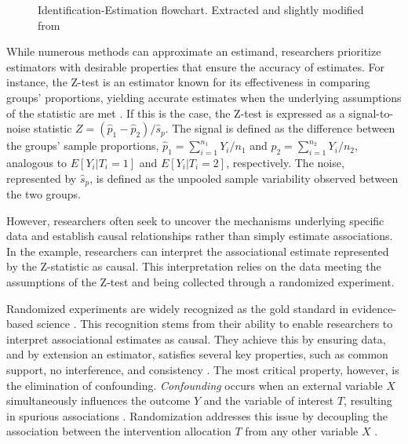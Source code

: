 \documentclass[
  authoryear,
  review,
  1p]{elsarticle}
\begin{document}
\begin{figure}


\caption{\label{fig-IEflow}Identification-Estimation flowchart.
Extracted and slightly modified from \citet[pp.~32]{Neal_2020}}

\end{figure}%

While numerous methods can approximate an estimand, researchers
prioritize estimators with desirable properties that ensure the accuracy
of estimates. For instance, the Z-test is an estimator known for its
effectiveness in comparing groups' proportions, yielding accurate
estimates when the underlying assumptions of the statistic are met
\citep{Kanji_2006}. If this is the case, the Z-test is expressed as a
signal-to-noise statistic
\(Z = (\hat{p}_{1} - \hat{p}_{2})/ \hat{s}_{p}\). The signal is defined
as the difference between the groups' sample proportions,
\(\hat{p}_{1} = \sum_{i=1}^{n_{1}}{Y_{i}/n_{1}}\) and
\(\hat{p}_{2} = \sum_{i=1}^{n_{2}}{Y_{i}/n_{2}}\), analogous to
\(E[Y_{i}| T_{i}=1]\) and \(E[Y_{i}| T_{i}=2]\), respectively. The
noise, represented by \(\hat{s}_{p}\), is defined as the unpooled sample
variability observed between the two groups.

However, researchers often seek to uncover the mechanisms underlying
specific data and establish causal relationships rather than simply
estimate associations. In the example, researchers can interpret the
associational estimate represented by the Z-statistic as causal. This
interpretation relies on the data meeting the assumptions of the Z-test
and being collected through a randomized experiment.

Randomized experiments are widely recognized as the gold standard in
evidence-based science \citep{Hariton_et_al_2018, Hansson_2014}. This
recognition stems from their ability to enable researchers to interpret
associational estimates as causal. They achieve this by ensuring data,
and by extension an estimator, satisfies several key properties, such as
common support, no interference, and consistency
\citep{Morgan_et_al_2014, Neal_2020}. The most critical property,
however, is the elimination of confounding. \emph{Confounding} occurs
when an external variable \(X\) simultaneously influences the outcome
\(Y\) and the variable of interest \(T\), resulting in spurious
associations \citep{Everitt_et_al_2010}. Randomization addresses this
issue by decoupling the association between the intervention allocation
\(T\) from any other variable \(X\)
\citep{Morgan_et_al_2014, Neal_2020}.
\end{document}
